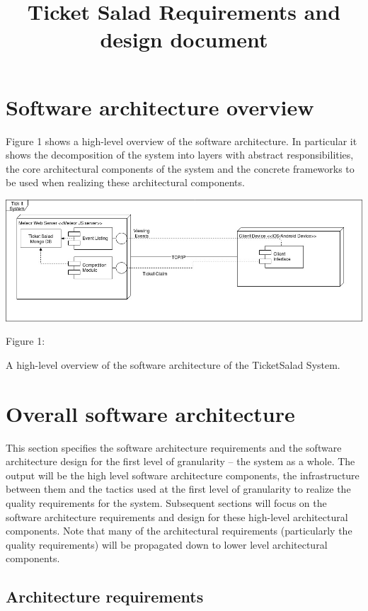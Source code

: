 \documentclass[11pt]{article}
\begin{document}
	\title{Ticket Salad Requirements and design document}
	\date{}
	\maketitle
	\tableofcontents
	\newpage
	
	\section{Software architecture overview}
	Figure 1 shows a high-level overview of the software architecture. In particular it shows the decomposition of the system into layers with abstract responsibilities, the core architectural components of the system and the concrete frameworks to be used when realizing these architectural components.
	
	\includegraphics[scale=0.4]{Architecture}
	\caption{Figure 1: }{A high-level overview of the software architecture of the TicketSalad System.}
	
	
	\section{Overall software architecture}
	This section specifies the software architecture requirements and the software architecture design
	for the first level of granularity – the system as a whole. The output will be the high level software
	architecture components, the infrastructure between them and the tactics used at the first level of
	granularity to realize the quality requirements for the system.
	Subsequent sections will focus on the software architecture requirements and design for these
	high-level architectural components. Note that many of the architectural requirements (particularly
	the quality requirements) will be propagated down to lower level architectural components.
	
	\subsection{Architecture requirements}
\end{document}
